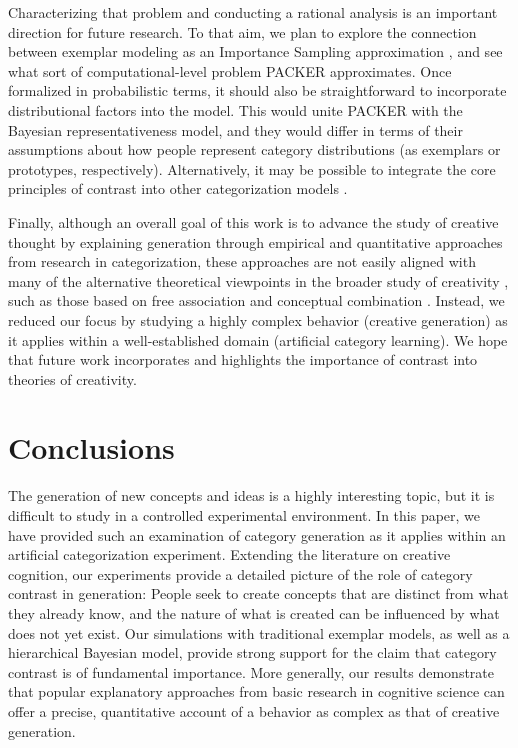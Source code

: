 \documentclass[12pt]{article}
\begin{document}
\begin{flushleft}
Characterizing that problem and conducting a rational analysis is an important
direction for future research. To that aim, we plan to explore the connection
between exemplar modeling as an Importance Sampling approximation
\citep{shi10exemplar}, and see what sort of computational-level problem PACKER
approximates. Once formalized in probabilistic terms, it should also be
straightforward to incorporate distributional factors into the model. This would
unite PACKER with the Bayesian representativeness model, and they would differ
in terms of their assumptions about how people represent category distributions
(as exemplars or prototypes, respectively). Alternatively, it may be possible to
integrate the core principles of contrast into other categorization models
\citep[e.g.,][]{love2004sustain,kurtz2007divergent,smith2000thirty}.

Finally, although an overall goal of this work is to advance the study of
creative thought by explaining generation through empirical and quantitative
approaches from research in categorization, these approaches are not easily
aligned with many of the alternative theoretical viewpoints in the broader study
of creativity \citep[for a review see][]{kozbelt2010theories}, such as those
based on free association \citep{mednick1962associative} and conceptual
combination \citep{estes2002emergence,murphy1988comprehending}. Instead, we
reduced our focus by studying a highly complex behavior (creative generation) as
it applies within a well-established domain (artificial category learning). We
hope that future work incorporates and highlights the importance of contrast
into theories of creativity.



\section{Conclusions}

The generation of new concepts and ideas is a highly interesting topic, but it
is difficult to study in a controlled experimental environment. In this paper,
we have provided such an examination of category generation as it applies within
an artificial categorization experiment. Extending the literature on creative
cognition, our experiments provide a detailed picture of the role of category
contrast in generation: People seek to create concepts that are distinct from
what they already know, and the nature of what is created can be influenced by
what does not yet exist. Our simulations with traditional exemplar models, as
well as a hierarchical Bayesian model, provide strong support for the claim that
category contrast is of fundamental importance. More generally, our results
demonstrate that popular explanatory approaches from basic research in cognitive
science can offer a precise, quantitative account of a behavior as complex as
that of creative generation.



\end{flushleft}
\end{document}
